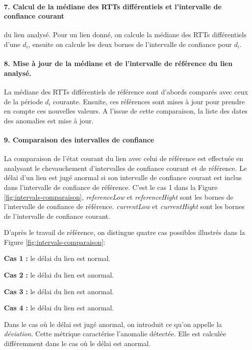   
  \paragraph{7. Calcul de la médiane des RTTs différentiels et   l'intervalle de confiance courant} du lien analysé. Pour un lien donné, on calcule la médiane des RTTs différentiels d'une $d_i$, ensuite on calcule les deux bornes de l'intervalle de confiance pour $d_i$.
  
 
  
  
  \paragraph{8. Mise à jour de la médiane et de l'intervalle de  référence du lien analysé.} La médiane des RTTs différentiels de référence sont d'abords comparés avec ceux de la période $d_i$ courante. Ensuite, ces références sont mises à jour pour prendre en compte ces nouvelles valeurs. A l'issue de cette comparaison, la liste des dates des anomalies est mise à jour.
  

 \paragraph{9. Comparaison des intervalles de confiance} 

La comparaison de l'état courant du lien avec celui de référence est effectuée en analysant le chevauchement d'intervalles de confiance  courant et de référence. Le délai d'un lien est jugé anormal si son intervalle de confiance courant est inclus dans l'intervalle de confiance de référence. C'est le cas 1 dans la Figure 	\ref{fig:intervals-comparaison},  \textit{referenceLow} et \textit{referenceHight} sont les bornes de l'intervalle de confiance de référence.  \textit{currentLow} et \textit{currentHight} sont les bornes de l'intervalle de confiance courant.

D'après le travail de référence, on distingue quatre cas possibles  illustrés dans la Figure 	\ref{fig:intervals-comparaison}:

\textbf{Cas 1 :} le délai du lien est normal.

\textbf{Cas 2 :} le délai du lien est anormal.

\textbf{Cas 3 :} le délai du lien est anormal.

\textbf{Cas 4 :} le délai du lien est anormal.

Dans le cas où le délai est jugé anormal, on introduit ce qu'on appelle la \textit{déviation}. Cette métrique caractérise l'anomalie détectée. Elle est calculée différemment dans le cas où le délai est anormal.

